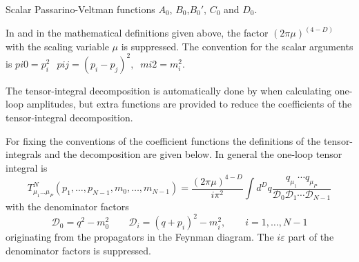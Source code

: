  {Scalar Passarino-Veltman functions $A_0$, $B_0$,$B_0'$, $C_0$ and $D_0$.}

In \fc and in the mathematical definitions given above,
the factor $(2\pi\mu)^{(4-D)}$ with the scaling variable $\mu$ is suppressed.
The convention for the scalar arguments is
$pi0 = p_i^2 \,\; \;pij = (p_i - p_j)^2, \; \; mi2 = m_i^2$.

\beom
{}
\enom

The tensor-integral decomposition is automatically done by
\fc when calculating one-loop amplitudes, 
but extra functions are provided to reduce the coefficients of the 
tensor-integral decomposition.

For fixing the conventions of the coefficient functions
the definitions of the tensor-integrals and the decomposition are given below.
In general the one-loop tensor integral is 
\[
T^{N}_{\mu_{1}\ldots\mu_{P}} (p_{1},\ldots,p_{N-1},m_{0},\ldots,m_{N-1})=
\frac{(2\pi\mu)^{4-D}}{i\pi^{2}}\int d^{D}\!q
\frac{q_{\mu _{1}}\cdots q_{\mu _{P}}}{
{\mathcal D}_{0}{\mathcal D}_{1}\cdots
{\mathcal D}_{N-1}
}
\]
with the denominator factors
\[
{\mathcal D}_{0}=
q^{2}-m_{0}^{2} \nonumber \qquad 
{\mathcal D}_{i}=
(q+p_{i})^{2}-m_{i}^{2}, \nonumber \qquad i=1,\ldots,N-1 \nonumber
\]
originating from the propagators in the Feynman diagram.
The $i \varepsilon $ part of the denominator factors is suppressed.

